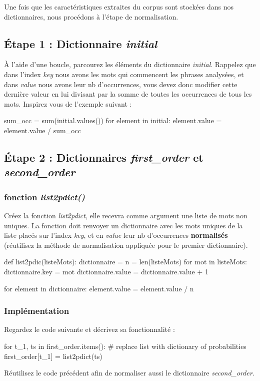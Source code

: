 Une fois que les caractéristiques extraites du corpus sont stockées dans nos dictionnaires, nous procédons à l'étape de normalisation.

\subsection{Étape 1 : Dictionnaire \textit{initial}}

À l'aide d'une boucle, parcourez les éléments du dictionnaire \textit{initial}.
Rappelez que dans l'index \textit{key} nous avons les mots qui commencent les phrases analysées, et dans \textit{value} nous avons leur nb d'occurrences, vous devez donc modifier cette dernière valeur en lui divisant par la somme de toutes les occurrences de tous les mots. Inspirez vous de l'exemple suivant :

\begin{python}
sum_occ = sum(initial.values())
for element in initial:
 element.value = element.value / sum_occ
\end{python}

\subsection{Étape 2 : Dictionnaires \textit{first\_order} et \textit{second\_order}}

\subsubsection{fonction \textit{list2pdict()}}
Créez la fonction \textit{list2pdict}, elle recevra comme argument une liste de mots non uniques. La fonction doit renvoyer un dictionnaire avec les mots uniques de la liste placés sur l'index \textit{key}, et en \textit{value} leur nb d'occurrences \textbf{normalisés} (réutilisez la méthode de normalisation appliquée pour le premier dictionnaire).
\begin{python}
def list2pdic(listeMots):
 dictionnaire ={}
 n = len(listeMots)
 for mot in listeMots:
  dictionnaire.key = mot
  dictionnaire.value = dictionnaire.value + 1
  
 for element in dictionnaire:
  element.value = element.value / n

\end{python}

\subsubsection{Implémentation}
Regardez le code suivante et décrivez sa fonctionnalité :
\begin{python}
for t_1, ts in first_order.items():
 # replace list with dictionary of probabilities
 first_order[t_1] = list2pdict(ts)
\end{python}
\vspace{5cm}
Réutilisez le code précédent afin de normaliser aussi le dictionnaire \textit{second\_order}.

